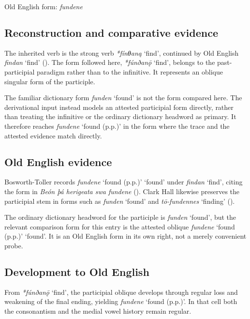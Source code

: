 \documentclass[
  british,
  a4paper,
  openany]{book}
\providecommand{\Recon}[1]{\emph{*#1}}
{\catcode`→=\active \global\def→{\ensuremath{\rightarrow}}}
\providecommand{\Recon}[1]{\emph{*#1}}
{\catcode`→=\active \global\def→{\ensuremath{\rightarrow}}}
\begin{document}
Old English form: \emph{fundene}

\subsection{Reconstruction and comparative
evidence}\label{reconstruction-and-comparative-evidence-112}

The inherited verb is the strong verb {\Recon{fínθaną} `find'},
continued by Old English {\emph{findan}} `find'
(). The form
followed here, {\Recon{fúnðanǭ} `find'}, belongs to the past-participial
paradigm rather than to the infinitive. It represents an oblique
singular form of the participle.

The familiar dictionary form {\emph{funden}} `found' is not the form
compared here. The derivational input instead models an attested
participial form directly, rather than treating the infinitive or the
ordinary dictionary headword as primary. It therefore reaches
{\emph{fundene}} `found (p.p.)' in the form where the trace and the
attested evidence match directly.

\subsection{Old English evidence}\label{old-english-evidence-112}

Bosworth-Toller records {\emph{fundene}} `found (p.p.)' `found' under
{\emph{findan}} `find', citing the form in \emph{Beón þá herigeata swa
fundene} (). Clark Hall likewise preserves the participial stem in forms such
as {\emph{funden}} `found' and \emph{tō-fundennes} `finding'
().

The ordinary dictionary headword for the participle is {\emph{funden}}
`found', but the relevant comparison form for this entry is the attested
oblique {\emph{fundene}} `found (p.p.)' `found'. It is an Old English
form in its own right, not a merely convenient probe.

\subsection{Development to Old
English}\label{development-to-old-english-112}

From {\Recon{fúnðanǭ} `find'}, the participial oblique develops through
regular loss and weakening of the final ending, yielding
{\emph{fundene}} `found (p.p.)'. In that cell both the consonantism and
the medial vowel history remain regular.
\end{document}
